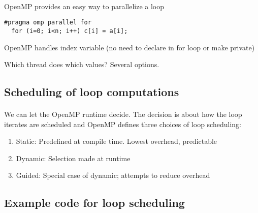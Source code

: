 \paragraph{}
OpenMP provides an easy way to parallelize a loop



\begin{verbatim}
#pragma omp parallel for
  for (i=0; i<n; i++) c[i] = a[i];

\end{verbatim}

OpenMP handles index variable (no need to declare in for loop or make private)

Which thread does which values?  Several options.



\subsection*{Scheduling of  loop computations}


\paragraph{}
We can let  the OpenMP runtime decide. The decision is about how the loop iterates are scheduled
and  OpenMP defines three choices of loop scheduling:
\begin{enumerate}
\item Static: Predefined at compile time. Lowest overhead, predictable

\item Dynamic: Selection made at runtime 

\item Guided: Special case of dynamic; attempts to reduce overhead
\end{enumerate}

\noindent



\subsection*{Example code for loop scheduling}

\paragraph{}
















